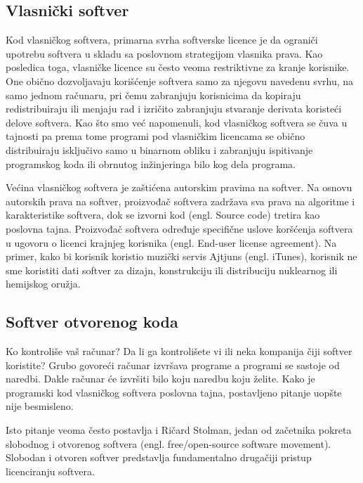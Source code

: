 \documentclass[a4paper]{article}
\begin{document}
\subsection{Vlasnički softver}
\label{vlasnicki_softver}

Kod vlasničkog softvera, primarna svrha softverske licence je da ograniči upotrebu softvera u skladu sa 
poslovnom strategijom vlasnika prava. Kao posledica toga, vlasničke licence su često veoma restriktivne za 
kranje korisnike. One obično dozvoljavaju korišćenje softvera samo za njegovu navedenu svrhu, na samo jednom
računaru, pri čemu zabranjuju korisnicima da kopiraju redistribuiraju ili menjaju rad i izričito zabranjuju
stvaranje derivata koristeći delove softvera.
Kao što smo već napomenuli, kod vlasničkog softvera se čuva u tajnosti pa prema tome programi pod 
vlasničkim licencama se obično distribuiraju isključivo samo u binarnom obliku i zabranjuju ispitivanje
programskog koda ili obrnutog inžinjeringa bilo kog dela programa.

Većina vlasničkog softvera je zaštićena autorskim pravima na softver. Na osnovu autorskih prava na softver,
proizvođač softvera zadržava sva prava na algoritme i karakteristike softvera, dok se izvorni kod (engl. Source code)
tretira kao poslovna tajna. Proizvođač softvera određuje specifične uslove koršćenja softvera u ugovoru o licenci 
krajnjeg korisnika (engl. End-user license agreement). Na primer, kako bi korisnik koristio muzički servis Ajtjuns (engl. iTunes),
korisnik ne sme koristiti dati softver za dizajn, konstrukciju ili distribuciju nuklearnog ili hemijskog oružja. \cite{apple}

\subsection{Softver otvorenog koda}
\label{softver_otvorenog_koda}

Ko kontroliše vaš računar? Da li ga kontrolišete vi ili neka kompanija čiji softver koristite? Grubo govoreći računar izvršava
programe a programi se sastoje od naredbi. Dakle računar će izvršiti bilo koju naredbu koju želite. Kako je programski kod 
vlasničkog softvera poslovna tajna, postavljeno pitanje uopšte nije besmisleno.

Isto pitanje veoma često postavlja i Ričard Stolman, jedan od začetnika pokreta slobodnog i otvorenog softvera 
(engl. free/open-source software movement). Slobodan i otvoren softver predstavlja fundamentalno drugačiji 
pristup licenciranju softvera.
\end{document}
